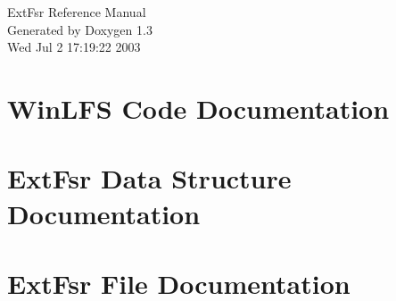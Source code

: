 \documentclass[a4paper]{article}
\begin{document}
\begin{titlepage}
\vspace*{7cm}
\begin{center}
{\Large Ext\-Fsr Reference Manual}\\
\vspace*{1cm}
{\large Generated by Doxygen 1.3}\\
\vspace*{0.5cm}
{\small Wed Jul 2 17:19:22 2003}\\
\end{center}
\end{titlepage}
\tableofcontents
{}
\section{Win\-LFS Code Documentation}
\label{index}\hypertarget{index}{}
\section{Ext\-Fsr Data Structure Documentation}



\section{Ext\-Fsr File Documentation}


\printindex
\end{document}
